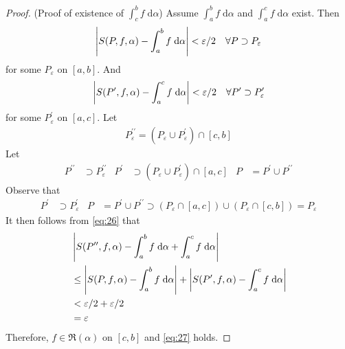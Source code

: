 \documentclass[thmcnt=section, 12pt]{my-elegantbook}
\begin{document}
\begin{proof}
    \par (Proof of existence of $\int_c^b f \; \mathrm{d}\alpha$) Assume $\int_a^b f \; \mathrm{d}\alpha$ and $\int_a^c f \; \mathrm{d}\alpha$ exist. Then 
    \begin{align*}
        \left\lvert S(P, f, \alpha) - \int_a^b f \; \mathrm{d}\alpha \right\rvert < \varepsilon / 2
        \quad \forall P \supset P_\varepsilon
    \end{align*}
    for some $P_\varepsilon$ on $[a, b]$. And
    \begin{align*}
        \left\lvert S(P^\prime, f, \alpha) - \int_a^c f \; \mathrm{d}\alpha \right\rvert < \varepsilon / 2
        \quad \forall P^\prime \supset P_\varepsilon^\prime
    \end{align*}
    for some $P_\varepsilon^\prime$ on $[a, c]$.
    Let
    \begin{align*}
        P_\varepsilon^{\prime\prime} = (P_\varepsilon \cup P_\varepsilon^\prime) \cap [c, b]
    \end{align*}
    Let
    \begin{align*}
        P^{\prime\prime} &\supset P_\varepsilon^{\prime\prime} &
        P^\prime &\supset (P_\varepsilon \cup P_\varepsilon^\prime) \cap [a, c] &
        P &= P^\prime \cup P^{\prime\prime}
    \end{align*} 
    Observe that 
    \begin{align*}
        P^\prime &\supset P_\varepsilon^\prime &
        P &= P^\prime \cup P^{\prime\prime}
        \supset (P_\varepsilon \cap [a, c]) \cup (P_\varepsilon \cap [c, b])
        = P_\varepsilon
    \end{align*}
    It then follows from \eqref{eq:26} that
    \begin{align*}
        &\left\lvert 
            S(P^{\prime\prime}, f, \alpha)
            - \int_a^b f \; \mathrm{d}\alpha
            + \int_a^c f \; \mathrm{d}\alpha 
         \right\rvert \\ 
        &\leq \left\lvert 
            S(P, f, \alpha)
            - \int_a^b f \; \mathrm{d}\alpha
         \right\rvert + \left\lvert 
            S(P^\prime, f, \alpha)
            - \int_a^c f \; \mathrm{d}\alpha
         \right\rvert \\ 
        &< \varepsilon / 2 + \varepsilon / 2 \\ 
        &= \varepsilon
    \end{align*} 
    Therefore, $f \in \mathfrak{R}(\alpha)$ on $[c, b]$ and \eqref{eq:27} holds.




\end{proof}
\end{document}
